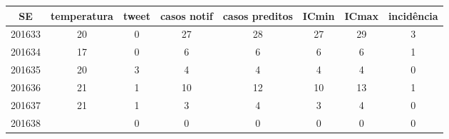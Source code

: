 \begin{tabular}{c|ccccccc}
  \hline
SE & temperatura & tweet & casos notif & casos preditos & ICmin & ICmax & incidência \\ 
  \hline
201633 & 20 & 0 & 27 & 28 & 27 & 29 & 3 \\ 
  201634 & 17 & 0 & 6 & 6 & 6 & 6 & 1 \\ 
  201635 & 20 & 3 & 4 & 4 & 4 & 4 & 0 \\ 
  201636 & 21 & 1 & 10 & 12 & 10 & 13 & 1 \\ 
  201637 & 21 & 1 & 3 & 4 & 3 & 4 & 0 \\ 
  201638 &  & 0 & 0 & 0 & 0 & 0 & 0 \\ 
   \hline
\end{tabular}
